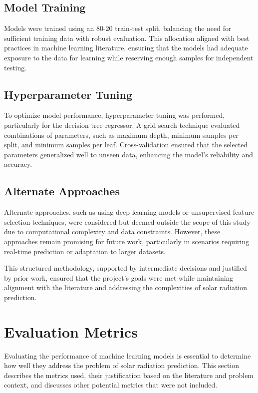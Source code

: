\documentclass[10pt,twocolumn]{article}
\begin{document}
\begin{itemize}
\subsection{Model Training}
Models were trained using an 80-20 train-test split, balancing the need for sufficient training data with robust evaluation. This allocation aligned with best practices in machine learning literature, ensuring that the models had adequate exposure to the data for learning while reserving enough samples for independent testing.

\subsection{Hyperparameter Tuning}
To optimize model performance, hyperparameter tuning was performed, particularly for the decision tree regressor. A grid search technique evaluated combinations of parameters, such as maximum depth, minimum samples per split, and minimum samples per leaf. Cross-validation ensured that the selected parameters generalized well to unseen data, enhancing the model's reliability and accuracy.

\subsection{Alternate Approaches}
Alternate approaches, such as using deep learning models or unsupervised feature selection techniques, were considered but deemed outside the scope of this study due to computational complexity and data constraints. However, these approaches remain promising for future work, particularly in scenarios requiring real-time prediction or adaptation to larger datasets.

This structured methodology, supported by intermediate decisions and justified by prior work, ensured that the project's goals were met while maintaining alignment with the literature and addressing the complexities of solar radiation prediction.




\section*{Evaluation Metrics}

Evaluating the performance of machine learning models is essential to determine how well they address the problem of solar radiation prediction. This section describes the metrics used, their justification based on the literature and problem context, and discusses other potential metrics that were not included.


\end{itemize}
\end{document}
